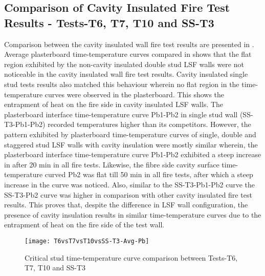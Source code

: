 \subsection{Comparison of Cavity Insulated Fire Test Results - Tests-T6, T7, T10 and SS-T3}

Comparison between the cavity insulated wall fire test results are presented in . Average plasterboard time-temperature curves compared in  shows that the flat region exhibited by the non-cavity insulated double stud LSF walls were not noticeable in the cavity insulated wall fire test results. Cavity insulated single stud tests results also matched this behaviour wherein no flat region in the time-temperature curves were observed in the plasterboard. This shows the entrapment of heat on the fire side in cavity insulated LSF walls. The plasterboard interface time-temperature curve Pb1-Pb2 in single stud wall (SS-T3-Pb1-Pb2) recorded temperatures higher than its competitors. However, the pattern exhibited by plasterboard time-temperature curves of single, double and staggered stud LSF walls with cavity insulation were mostly similar wherein, the plasterboard interface time-temperature curve Pb1-Pb2 exhibited a steep increase in after 20 min in all fire tests. Likewise, the fibre side cavity surface time-temperature curved Pb2 was flat till 50 min in all fire tests, after which a steep increase in the curve was noticed. Also, similar to the SS-T3-Pb1-Pb2 curve the SS-T3-Pb2 curve was higher in comparison with other cavity insulated fire test results. This proves that, despite the difference in LSF wall configuration, the presence of cavity insulation results in similar time-temperature curves due to the entrapment of heat on the fire side of the test wall.
\begin{figure}[!htbp]
	\centering
		\texttt{[image: T6vsT7vsT10vsSS-T3-Avg-Pb]}  
	\caption{Critical stud time-temperature curve comparison between Tests-T6, T7, T10 and SS-T3}
	\label{fig:T6vsT7vsT10vsSS-T3-Avg-Pb}
\end{figure}


